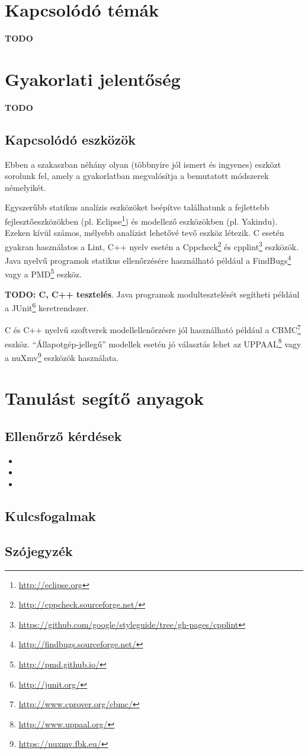 \section{Kapcsolódó témák}
\textbf{TODO}

\section{Gyakorlati jelentőség}
\textbf{TODO}

\subsection{Kapcsolódó eszközök}
Ebben a szakaszban néhány olyan (többnyire jól ismert és ingyenes) eszközt sorolunk fel, amely a gyakorlatban megvalósítja a bemutatott módszerek némelyikét.

Egyszerűbb statikus analízis eszközöket beépítve találhatunk a fejlettebb fejlesztőeszközökben (pl. Eclipse\footnote{\url{http://eclipse.org}}) és modellező eszközökben (pl. Yakindu). Ezeken kívül számos, mélyebb analízist lehetővé tevő eszköz létezik. C esetén gyakran használatos a Lint, C++ nyelv esetén a Cppcheck\footnote{\url{http://cppcheck.sourceforge.net/}} és cpplint\footnote{\url{https://github.com/google/styleguide/tree/gh-pages/cpplint}} eszközök. Java nyelvű programok statikus ellenőrzésére használható például a FindBugs\footnote{\url{http://findbugs.sourceforge.net/}} vagy a PMD\footnote{\url{http://pmd.github.io/}} eszköz.

\textbf{TODO: C, C++ tesztelés}. Java programok modultesztelését segítheti például a JUnit\footnote{\url{http://junit.org/}} keretrendszer.

C és C++ nyelvű szoftverek modellellenőrzésre jól használható például a CBMC\footnote{\url{http://www.cprover.org/cbmc/}} eszköz. ``Állapotgép-jellegű'' modellek esetén jó választás lehet az UPPAAL\footnote{\url{http://www.uppaal.org/}} vagy a nuXmv\footnote{\url{https://nuxmv.fbk.eu/}} eszközök használata.

\section{Tanulást segítő anyagok}

\subsection{Ellenőrző kérdések}
\begin{itemize}
	\item 
	\item
	\item
\end{itemize}

\subsection{Kulcsfogalmak}

\subsection{Szójegyzék}